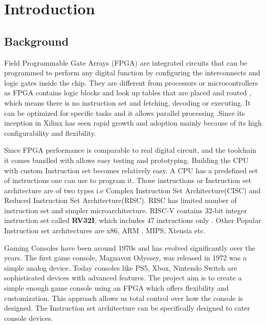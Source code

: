 \documentclass[a4paper,12pt]{article}
\begin{document}
    \section{Introduction}
    \subsection{Background}

    \phantom{}

    Field Programmable Gate Arrays (FPGA) are integrated circuits that can be programmed to perform any digital function by configuring the interconnects and logic gates inside the chip. They are different from processors or microcontrollers as FPGA contains logic blocks and look up tables that are placed and routed , which means there is no instruction set and fetching, decoding or executing. It can be optimized for specific tasks and it allows parallel processing .Since its inception in Xilinx has seen rapid growth and adoption mainly because of its high configurability and flexibility. 

    Since FPGA performance is comparable to real digital circuit, and the toolchain it comes bundled with allows easy testing and prototyping. Building the CPU with custom Instruction set becomes relatively easy. A CPU has a predefined set of instructions one can use to program it. Those instructions or Instruction set architecture are of two types i.e  Complex Instruction Set Architecture(CISC) and Reduced Instruction Set Architecture(RISC). RISC has limited number of instruction set and simpler microarchitecture. RISC-V contains 32-bit integer instruction set called \textbf{RV32I}, which includes 47 instructions only . Other Popular Instruction set architectures are x86, ARM , MIPS, Xtensia etc. 

    Gaming Consoles have been around 1970s and has evolved significantly over the years. The first game console, Magnavox Odyssey, was released in 1972 was a simple analog device. Today consoles like PS5, Xbox, Nintendo Switch are sophisticated devices with advanced features. %
    The project aim is to create a simple enough game console using an FPGA which offers flexibility and customization. This approach allows us total control over how the console is designed. The Instruction set architecture can be specifically designed to cater console devices. 
\end{document}
